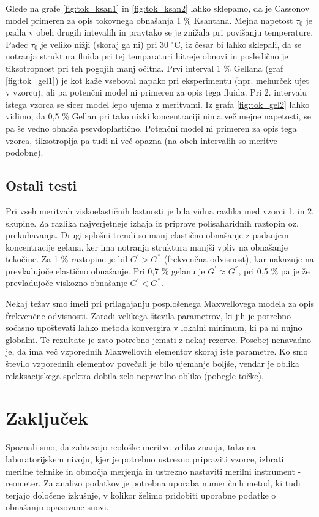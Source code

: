 \documentclass{article}
\begin{document}
Glede na grafe \ref{fig:tok_ksan1} in \ref{fig:tok_ksan2} lahko sklepamo, da je Cassonov model primeren za opis tokovnega obnašanja 1 \% Ksantana. Mejna napetost $\tau_0$ je padla v obeh drugih intevalih in pravtako se je znižala pri povišanju temperature. Padec $\tau_0$ je veliko nižji (skoraj ga ni) pri 30 $^\circ$C, iz česar bi lahko sklepali, da se notranja struktura fluida pri tej temparaturi hitreje obnovi in posledično je tiksotropnost pri teh pogojih manj očitna. Prvi interval 1 \% Gellana (graf \ref{fig:tok_gel1}) je kot kaže vseboval napako pri eksperimentu (npr. mehurček ujet v vzorcu), ali pa potenčni model ni primeren za opis tega fluida. Pri 2. intervalu istega vzorca se sicer model lepo ujema z meritvami. Iz grafa \ref{fig:tok_gel2} lahko vidimo, da 0,5 \% Gellan pri tako nizki koncentraciji nima več mejne napetosti, se pa še vedno obnaša psevdoplastično. Potenčni model ni primeren za opis tega vzorca, tiksotropija pa tudi ni več opazna (na obeh intervalih so meritve podobne).

\subsection{Ostali testi}
Pri vseh meritvah viskoelastičnih lastnosti je bila vidna razlika med vzorci 1. in 2. skupine. Za razlika najverjetneje izhaja iz priprave polisaharidnih raztopin oz. prekuhavanja. Drugi splošni trendi so manj elastično obnašanje z padanjem koncentracije gelana, ker ima notranja struktura manjši vpliv na obnašanje tekočine. Za 1 \% raztopine je bil $G^{'}>G^{''}$ (frekvenčna odvisnost), kar nakazuje na prevladujoče elastično obnašanje. Pri 0,7 \% gelanu je $G^{'} \approx G^{''}$, pri 0,5 \% pa je že prevladujoče viskozno obnašanje $G^{'}<G^{''}$.

Nekaj težav smo imeli pri prilagajanju posplošenega Maxwellovega modela za opis frekvenčne odvisnosti. Zaradi velikega števila parametrov, ki jih je potrebno sočasno upoštevati lahko metoda konvergira v lokalni minimum, ki pa ni nujno globalni. Te rezultate je zato potrebno jemati z nekaj rezerve. Posebej nenavadno je, da ima več vzporednih Maxwellovih elementov skoraj iste parametre. Ko smo število vzporednih elementov povečali je bilo ujemanje boljše, vendar je oblika relaksacijskega spektra dobila zelo nepravilno obliko (pobegle točke).

\section{Zaključek}
Spoznali smo, da zahtevajo reološke meritve veliko znanja, tako na laboratorijskem nivoju, kjer je potrebno ustrezno pripraviti vzorce, izbrati merilne tehnike in območja merjenja in ustrezno nastaviti merilni instrument - reometer. Za analizo podatkov je potrebna uporaba numeričnih metod, ki tudi terjajo določene izkušnje, v kolikor želimo pridobiti uporabne podatke o obnašanju opazovane snovi. 

\newpage
\nocite{*}


\end{document}
